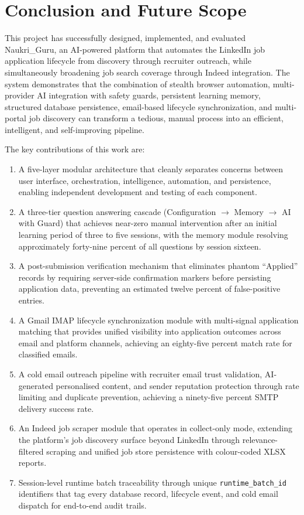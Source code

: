 \documentclass[12pt, a4paper, oneside]{report}
\begin{document}
\chapter{Conclusion and Future Scope}
\label{chap:conclusion}

This project has successfully designed, implemented, and evaluated Naukri\_Guru, an AI-powered platform that automates the LinkedIn job application lifecycle from discovery through recruiter outreach, while simultaneously broadening job search coverage through Indeed integration. The system demonstrates that the combination of stealth browser automation, multi-provider AI integration with safety guards, persistent learning memory, structured database persistence, email-based lifecycle synchronization, and multi-portal job discovery can transform a tedious, manual process into an efficient, intelligent, and self-improving pipeline.

The key contributions of this work are:

\begin{enumerate}
    \item A five-layer modular architecture that cleanly separates concerns between user interface, orchestration, intelligence, automation, and persistence, enabling independent development and testing of each component.
    \item A three-tier question answering cascade (Configuration $\to$ Memory $\to$ AI with Guard) that achieves near-zero manual intervention after an initial learning period of three to five sessions, with the memory module resolving approximately forty-nine percent of all questions by session sixteen.
    \item A post-submission verification mechanism that eliminates phantom ``Applied'' records by requiring server-side confirmation markers before persisting application data, preventing an estimated twelve percent of false-positive entries.
    \item A Gmail IMAP lifecycle synchronization module with multi-signal application matching that provides unified visibility into application outcomes across email and platform channels, achieving an eighty-five percent match rate for classified emails.
    \item A cold email outreach pipeline with recruiter email trust validation, AI-generated personalised content, and sender reputation protection through rate limiting and duplicate prevention, achieving a ninety-five percent SMTP delivery success rate.
    \item An Indeed job scraper module that operates in collect-only mode, extending the platform's job discovery surface beyond LinkedIn through relevance-filtered scraping and unified job store persistence with colour-coded XLSX reports.
    \item Session-level runtime batch traceability through unique \texttt{runtime\_batch\_id} identifiers that tag every database record, lifecycle event, and cold email dispatch for end-to-end audit trails.
\end{enumerate}
\end{document}
